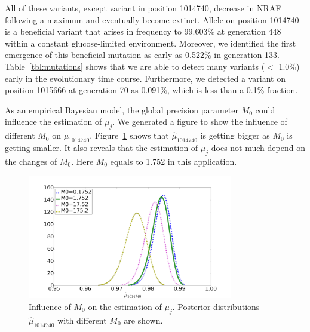 \documentclass[11pt,reqno]{amsart}
\begin{document}
All of these variants, except variant in position 1014740, decrease in NRAF following a maximum and eventually become extinct.
Allele on position 1014740 is a beneficial variant that arises in frequency to 99.603\% at generation 448 within a constant glucose-limited environment.
Moreover, we identified the first emergence of this beneficial mutation as early as 0.522\% in generation 133.
Table~\ref{tbl:mutations} shows that we are able to detect many variants ($<$ 1.0\%) early in the evolutionary time course.
Furthermore, we detected a variant on position 1015666 at generation 70 as 0.091\%, which is less than a 0.1\% fraction.

As an empirical Bayesian model, the global precision parameter $M_0$ could influence the estimation of $\mu_j$.
We generated a figure to show the influence of different $M_0$ on $\mu_{1014740}$.
Figure~\ref{tbl:M0} shows that $\hat{\mu}_{1014740}$ is getting bigger as $M_0$ is getting smaller.
It also reveals that the estimation of $\mu_j$ does not much depend on the changes of $M_0$.
Here $M_0$ equals to 1.752 in this application.
\begin{figure}[htbp]
\centering
\includegraphics[width=0.8\textwidth]{figs/diff_M0.png}
\caption{Influence of $M_0$ on the estimation of $\mu_j$.
Posterior distributions $\hat{\mu}_{1014740}$ with different $M_0$ are shown.}
\label{tbl:M0}
\end{figure}
\end{document}
